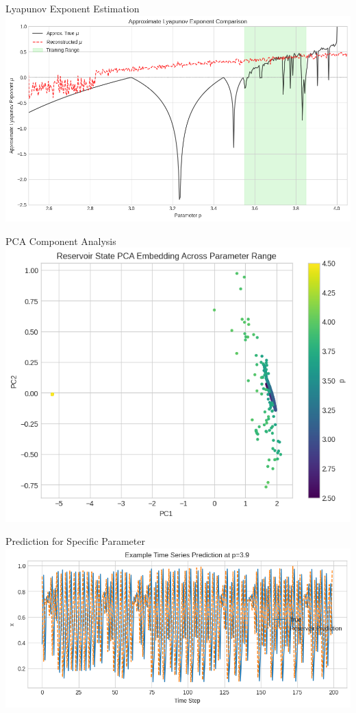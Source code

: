 \documentclass{beamer}
\begin{document}
\begin{frame}{Lyapunov Exponent Estimation}
  \includegraphics[width=1\linewidth]{figures/lyapanov_bd_rd.png}
\end{frame}

\begin{frame}{PCA Component Analysis}
  \includegraphics[width=0.8\linewidth]{figures/bd_elm_pca_analysis.png}
\end{frame}

\begin{frame}{Prediction for Specific Parameter}
  \includegraphics[width=1.0\linewidth]{figures/bd_5_prediction_for_specific_value.png}
\end{frame}
\end{document}
